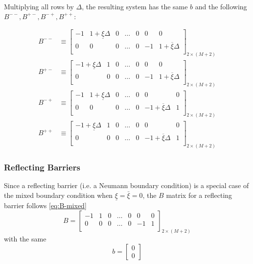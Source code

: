 \documentclass[11pt]{article}
\theoremstyle{definition}
\begin{document}
Multiplying all rows by $\Delta$, the resulting system has the same $b$ and the following $B^{--}, B^{+-}, B^{-+}, B^{++}$:
 
\begin{align}
B^{--} &\equiv 
\begin{bmatrix}
-1 & 1  + \underline{\xi}\Delta & 0 & \dots & 0 & 0 & 0 \\
0 & 0 & 0 & \dots & 0 & -1 & 1 + \overline{\xi}\Delta\\
\end{bmatrix}_{2 \times (M+2)} \\
B^{+-} &\equiv 
\begin{bmatrix}
-1 + \underline{\xi}\Delta & 1 & 0 & \dots & 0 & 0 & 0 \\
0 & 0 & 0 & \dots & 0 & -1 & 1 + \overline{\xi}\Delta\\
\end{bmatrix}_{2 \times (M+2)} \\
B^{-+} &\equiv 
\begin{bmatrix}
-1  & 1 + \underline{\xi}\Delta & 0 & \dots & 0 & 0 & 0 \\
0 & 0 & 0 & \dots & 0 & -1+ \overline{\xi}\Delta & 1\\
\end{bmatrix}_{2 \times (M+2)} \\
B^{++} &\equiv 
\begin{bmatrix}
-1 + \underline{\xi}\Delta & 1 & 0 & \dots & 0 & 0 & 0 \\
0 & 0 & 0 & \dots & 0 & -1+ \overline{\xi}\Delta & 1 \\
\end{bmatrix}_{2 \times (M+2)}
\end{align}



\subsubsection{Reflecting Barriers}
Since a reflecting barrier (i.e. a Neumann boundary condition) is a special case of the mixed boundary condition when  $\underline{\xi} = \bar{\xi} = 0$, the $B$ matrix for a reflecting barrier follows \cref{eq:B-mixed}
\begin{equation}
	B = \begin{bmatrix}
	-1& 1 & 0 & \dots & 0 & 0 & 0 \\
	0 & 0 & 0 & \dots & 0 & -1 & 1\\
	\end{bmatrix}_{2 \times (M+2)}
	\end{equation}
with the same 
\begin{equation}
	b = \begin{bmatrix}	
			0 \\
		 	0
		 	\end{bmatrix}
\end{equation}
\end{document}
